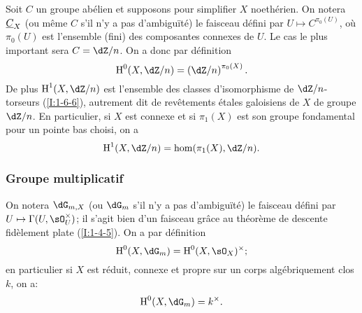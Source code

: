 Soit $C$ un groupe abélien et supposons pour simplifier $X$ noethérien. On 
notera $\underline{C}_X$ (ou même $C$ s'il n'y a pas d'ambiguïté) le faisceau 
défini par $U\mapsto C^{\pi_0(U)}$, où $\pi_0(U)$ est l'ensemble (fini) des 
composantes connexes de $U$. Le cas le plus important sera $C=\dZ/n$. On a donc 
par définition 
\[
  \h^0(X,\dZ/n)=\left(\dZ/n\right)^{\pi_0(X)}\text{.}
\]
De plus $\h^1(X,\dZ/n)$ est l'ensemble des classes d'isomorphisme de 
$\dZ/n$-torseurs (\ref{I:1-6-6}), autrement dit de revêtements étales 
galoisiens de $X$ de groupe $\dZ/n$. En particulier, si $X$ est connexe et si 
$\pi_1(X)$ est son groupe fondamental pour un pointe bas choisi, on a 
\[
  \h^1(X,\dZ/n) = \hom(\pi_1(X),\dZ/n)\text{.}
\]





\subsubsection{Groupe multiplicatif}\label{I:2-2-2}

On notera $\dG_{m,X}$ (ou $\dG_m$ s'il n'y a pas d'ambiguïté) le faisceau 
défini par $U\mapsto \Gamma(U,\sO_U^\times)$; il s'agit bien d'un faisceau 
grâce au théorème de descente fidèlement plate (\ref{I:1-4-5}). On a 
par définition 
\[
  \h^0(X,\dG_m) = \h^0(X,\sO_X)^\times\text{;}
\]
en particulier si $X$ est réduit, connexe et propre sur un corps 
algébriquement clos $k$, on a:
\[
  \h^0(X,\dG_m) = k^\times\text{.}
\]

